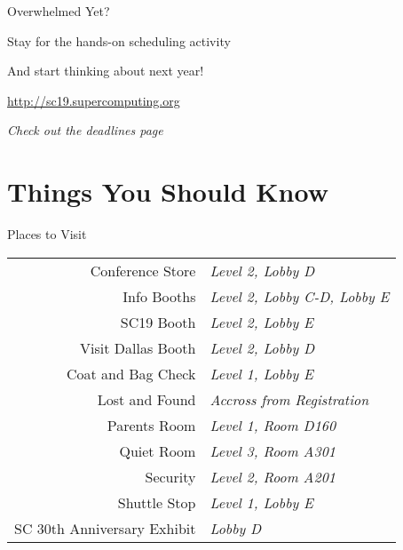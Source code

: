 \documentclass[presentation,xcolor=table]{beamer}
\begin{document}
\begin{frame}[label={sec:org6bde977}]{Overwhelmed Yet?}
\begin{block}{\centering Stay for the hands-on scheduling activity}
\begin{center}
And start thinking about next year!

\url{http://sc19.supercomputing.org}

\emph{Check out the deadlines page}
\end{center}
\end{block}
\end{frame}


\section{Things You Should Know}
\label{sec:org4f50c71}
\begin{frame}[label={sec:orgeb91e1f}]{Places to Visit}
\begin{center}
\begin{tabular}{rl}
\alert{Conference Store} & \emph{Level 2, Lobby D}\\
\alert{Info Booths} & \emph{Level 2, Lobby C-D, Lobby E}\\
\alert{SC19 Booth} & \emph{Level 2, Lobby E}\\
\alert{Visit Dallas Booth} & \emph{Level 2, Lobby D}\\
\alert{Coat and Bag Check} & \emph{Level 1, Lobby E}\\
\alert{Lost and Found} & \emph{Accross from Registration}\\
\alert{Parents Room} & \emph{Level 1, Room D160}\\
\alert{Quiet Room} & \emph{Level 3, Room A301}\\
\alert{Security} & \emph{Level 2, Room A201}\\
\alert{Shuttle Stop} & \emph{Level 1, Lobby E}\\
\alert{SC 30th Anniversary Exhibit} & \emph{Lobby D}\\
\end{tabular}
\end{center}
\end{frame}
\end{document}
